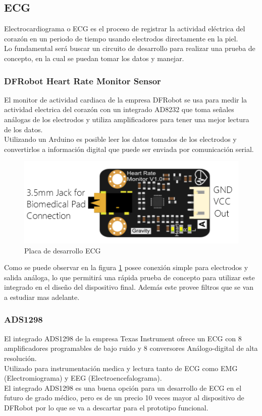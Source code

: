\subsection{ECG}
Electrocardiograma o ECG es el proceso de registrar la actividad eléctrica del corazón en un periodo de tiempo usando electrodos directamente en la piel.\\
Lo fundamental será buscar un circuito de desarrollo para realizar una prueba de concepto, en la cual se puedan tomar los datos y manejar.
\subsubsection{DFRobot Heart Rate Monitor Sensor}
El monitor de actividad cardiaca de la empresa DFRobot se usa para medir la actividad electrica del corazón con un integrado AD8232\cite{ad8232} que toma señales análogas de los electrodos y utiliza amplificadores para tener una mejor lectura de los datos.\\
Utilizando un Arduino es posible leer los datos tomados de los electrodos y convertirlos a información digital que puede ser enviada por comunicación serial.\\

\begin{figure}[H]
\centering
\includegraphics[scale=0.5]{figuras/sensor/ecg/ecg.png}
\caption{Placa de desarrollo ECG}
\label{ecg}
\end{figure}

Como se puede observar en la figura \ref{ecg} posee conexión simple para electrodos y salida análoga, lo que permitirá una rápida prueba de concepto para utilizar este integrado en el diseño del dispositivo final. Además este provee filtros que se van a estudiar mas adelante.


\subsubsection{ADS1298}
El integrado ADS1298 de la empresa Texas Instrument ofrece un ECG con 8 amplificadores programables de bajo ruido y 8 conversores Análogo-digital de alta resolución.\\
Utilizado para instrumentación medica y lectura tanto de ECG como EMG (Electromiograma) y EEG (Electroencefalograma).\\
El integrado ADS1298 es una buena opción para un desarrollo de ECG en el futuro de grado médico, pero es de un precio 10 veces mayor al dispositivo de DFRobot por lo que se va a descartar para el prototipo funcional.
